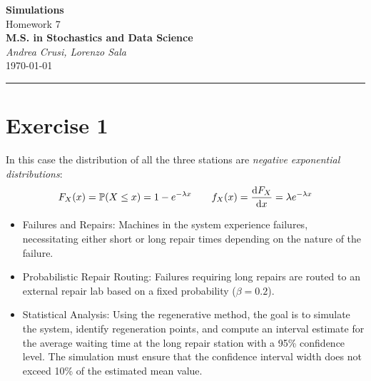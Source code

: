 \documentclass[12pt]{article}
\begin{document}
	\textcolor{UM_Brown}{
		\begin{center}
			\textbf{\Large Simulations}\\
			\vspace{5pt}
			Homework 7 \\
			\vspace{5pt}
			\textbf{M.S. in Stochastics and Data Science}\\
			\vspace{20pt}
			\textit{Andrea Crusi, Lorenzo Sala} \\
			\vspace{5pt}
			\today
		\end{center}
		\vspace{10pt}
		\hrule
	}
	
	
	
	
	\section{Exercise 1}
	In this case the distribution of all the three stations are \emph{negative exponential distributions}:
	\begin{equation*}
		F_X(x)=\mathbb{P}(X\leq x)=1-e^{-\lambda x}\qquad f_X(x)=\frac{\mathop{}\!\mathrm{d} F_X}{\mathop{}\!\mathrm{d} x}=\lambda e^{-\lambda x}
	\end{equation*}
	
	\begin{itemize}
		\item Failures and Repairs: Machines in the system experience failures, necessitating either short or long repair times depending on the nature of the failure.
		\item Probabilistic Repair Routing: Failures requiring long repairs are routed to an external repair lab based on a fixed probability ($\beta = 0.2$).
		\item Statistical Analysis: Using the regenerative method, the goal is to simulate the system, identify regeneration points, and compute an interval estimate for the average waiting time at the long repair station with a 95\% confidence level. The simulation must ensure that the confidence interval width does not exceed 10\% of the estimated mean value.
	\end{itemize}
	
\end{document}
